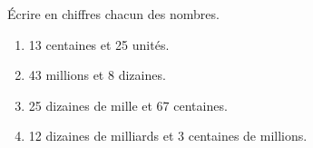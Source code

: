 \begin{exercice}{}{}
    Écrire en chiffres chacun des nombres.
    \begin{enumerate}
       \item 13 centaines et 25 unités.
       \item 43 millions et 8 dizaines.
       \item 25 dizaines de mille et 67 centaines.
       \item 12 dizaines de milliards et 3 centaines de millions.
    \end{enumerate}
 \end{exercice}